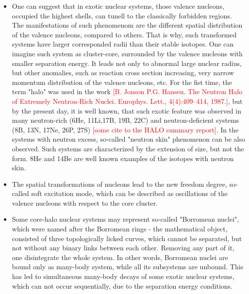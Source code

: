 \begin{itemize}
	\item 
	One can suggest that in exotic nuclear systems, those valence nucleons, occupied the highest shells, can tunell to the classically forbidden regions. 
	The manifestations of such phenomenom are the different spatial distribution of the valence nucleons, compared to others. 
	That is why, such transformed systems have larger corresponded radii than their stable isotopes.
	One can imagine such system as cluster-core, surrounded by the valence nucleons with smaller separation energy.
	It leads not only to abnormal large nuclear radius, but other anomalies, such as reaction cross section increasing, very narrow momentum distribution of the valence nucleons, etc.
	For the fist time, the term "halo" was used in the work \textcolor{red}{[B. Jonson P.G. Hansen. The Neutron Halo of Extremely Neutron-Rich Nuclei. Europhys. Lett., 4(4):409–414, 1987.]}, but by the present day, it is well known, that such exotic feature was observed in many neutron-rich (6He, 11Li,17B, 19B, 22C) and neutron-deficient systems (8B, 13N, 17Ne, 26P, 27S) \textcolor{red}{[some cite to the HALO summary report]}.
	In the systems with neutron excess, so-called "neutron skin" phenomenon can be also observed.
	Such systems are characterized by the extension of size, but not the form. 8He and 14Be are well known examples of the isotopes with neutron skin.
	
	\item 
	The spatial transformations of nucleons lead to the new freedom degree, so-called soft excitation mode, which can be described as oscillations of the valence nucleons with respect to the core cluster. 
	
	\item 
	Some core-halo nuclear systems may represent so-called "Borromean nuclei", which were named after the Borromean rings - the mathematical object, consisted of three topologically licked curves, which cannot be separated, but not without any binary links between each other.
	Removing any part of it, one disintegrate the whole system.
	In other words, Borromean nuclei are bound only as many-body system, while all its subsystems are unbound.
	This has led to simultaneous many-body decays of some exotic nuclear systems, which can not occur sequentially, due to the separation energy conditions.
	

\end{itemize}



